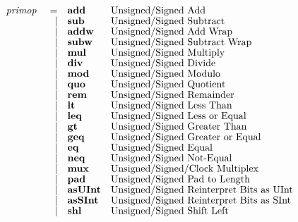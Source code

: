 \documentclass[12pt]{article}
\begin{document}
\[
{ \fontsize{10pt}{1.07em}\selectfont
\begin{array}{rrll}
\pd{primop}   &=               &\kws{add}            &\text{Unsigned/Signed Add}\\
              &\vert           &\kws{sub}            &\text{Unsigned/Signed Subtract}\\
              &\vert           &\kws{addw}           &\text{Unsigned/Signed Add Wrap}\\
              &\vert           &\kws{subw}           &\text{Unsigned/Signed Subtract Wrap}\\
              &\vert           &\kws{mul}            &\text{Unsigned/Signed Multiply}\\
              &\vert           &\kws{div}            &\text{Unsigned/Signed Divide}\\
              &\vert           &\kws{mod}            &\text{Unsigned/Signed Modulo}\\
              &\vert           &\kws{quo}            &\text{Unsigned/Signed Quotient}\\
              &\vert           &\kws{rem}            &\text{Unsigned/Signed Remainder}\\
              &\vert           &\kws{lt}             &\text{Unsigned/Signed Less Than}\\
              &\vert           &\kws{leq}            &\text{Unsigned/Signed Less or Equal}\\
              &\vert           &\kws{gt}             &\text{Unsigned/Signed Greater Than}\\
              &\vert           &\kws{geq}            &\text{Unsigned/Signed Greater or Equal}\\
              &\vert           &\kws{eq}             &\text{Unsigned/Signed Equal}\\
              &\vert           &\kws{neq}            &\text{Unsigned/Signed Not-Equal}\\
              &\vert           &\kws{mux}            &\text{Unsigned/Signed/Clock Multiplex}\\
              &\vert           &\kws{pad}            &\text{Unsigned/Signed Pad to Length}\\
              &\vert           &\kws{asUInt}         &\text{Unsigned/Signed Reinterpret Bits as UInt}\\
              &\vert           &\kws{asSInt}         &\text{Unsigned/Signed Reinterpret Bits as SInt}\\
              &\vert           &\kws{shl}            &\text{Unsigned/Signed Shift Left}\\

\end{array}}\]
\end{document}
